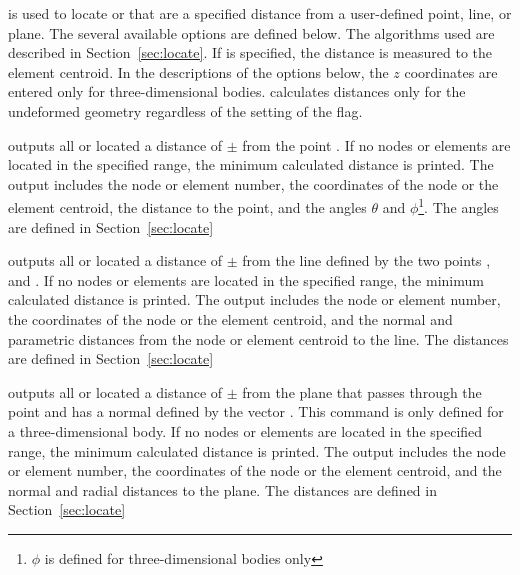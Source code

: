  {
 is used to locate  or  that are a
specified distance from a user-defined point, line, or plane.  The
several available options are defined below.  The algorithms used are
described in Section~\ref{sec:locate}.  If  is specified,
the distance is measured to the element centroid.  In the descriptions
of the  options below, the $z$ coordinates are entered only
for three-dimensional bodies.   calculates distances only
for the undeformed geometry regardless of the setting of the
 flag. 

 {
outputs all  or  located a
distance of $\pm$ from the
point .  If no nodes or elements are
located in the specified range, the minimum calculated distance
is printed.  The output includes the node or element number, the
coordinates of the node or the element centroid, the distance to the
point, and the angles $\theta$ and $\phi$\footnote{$\phi$ is defined for
three-dimensional bodies only}.  The angles are defined in
Section~\ref{sec:locate} 
}

 {
outputs all  or  located a distance of
$\pm$ from the line defined by the two
points , and . If
no nodes or elements are located in the specified range, the minimum
calculated distance is printed.  The output includes the node or element
number, the coordinates of the node or the element centroid, and the
normal and parametric distances from the node or element centroid to the
line.  The distances are defined in Section~\ref{sec:locate} 
}

 {
outputs all  or  located a 
distance of $\pm$ from the plane that
passes through the point  and has a normal
defined by the vector . This command is only
defined for a three-dimensional body.  If no nodes or elements are
located in the specified range, the minimum calculated distance is
printed.  The output includes the node or element number, the
coordinates of the node or the element centroid, and the normal and
radial distances to the plane.  The distances are defined in
Section~\ref{sec:locate} 
}
}

